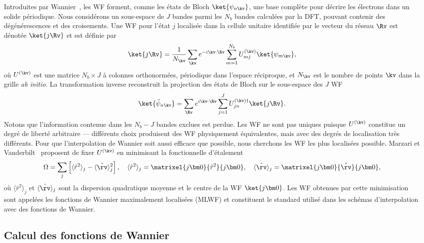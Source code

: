 Introduites par Wannier~\cite{wannierStructureElectronicExcitation1937}, les WF forment, comme les états de Bloch $\ket{\psi_{n\kv}}$, une base
complète pour décrire les électrons dans un solide périodique. Nous considérons
un sous-espace de $J$ bandes parmi les $N_b$ bandes calculées par
la DFT, pouvant contenir des dégénérescences et des croisements.
Une WF pour l'état $j$ localisée dans la cellule unitaire identifiée
par le vecteur du réseau $\Rv$ est dénotée $\ket{j\Rv}$ et est
définie par
\begin{equation}
    \ket{j\Rv} = \frac{1}{N_\kv}\sum_\kv e^{-i\kv\cdot\Rv}
    \sum_{m=1}^{N_b} U_{mj}^{(\kv)}\ket{\psi_{m\kv}},
    \label{eqn:c2_wf_1W}
\end{equation}
où $U^{(\kv)}$ est une matrice $N_b\times J$ à colonnes orthonormées,
périodique dans l'espace réciproque, et $N_\kv$ est le nombre de
points $\kv$ dans la grille \textit{ab initio}. La transformation
inverse reconstruit la projection des états de Bloch sur le
sous-espace des $J$ WF
\begin{equation}
    \ket{\tilde{\psi}_{n\kv}}=\sum_\Rv e^{i\kv\cdot\Rv}
    \sum_{j=1}^{J} U_{jn}^{(\kv)\dag}\ket{j\Rv}.
    \label{eqn:c2_wf_1B}
\end{equation}
Notons que l'information contenue dans les $N_b - J$ bandes exclues est
perdue. Les WF ne sont pas uniques puisque $U^{(\kv)}$ constitue un degré
de liberté arbitraire --- différents choix produisent des WF
physiquement équivalentes, mais avec des degrés de localisation
très différents. Pour que l'interpolation de Wannier soit aussi efficace que possible, nous cherchons les WF les plus localisées possible. Marzari et Vanderbilt~\cite{marzariMaximallyLocalizedGeneralized1997} proposent de fixer $U^{(\kv)}$ en minimisant la fonctionnelle d'étalement
\begin{equation}
    \Omega = \sum_j\left[\langle \hat{r}^2\rangle_j - \langle \hat{\rv} \rangle^2_j\right],\quad  \langle \hat{r}^2\rangle_j = \matrixel{j\bm 0}{\hat{r}^2}{j\bm 0},\quad\langle \hat{\rv} \rangle_j = \matrixel{j\bm 0}{\hat{\rv}}{j\bm 0},\label{eqn:spread}
\end{equation}
où $\langle \hat{r}^2\rangle_j$ et $\langle\hat{\rv}\rangle_j$ sont la dispersion quadratique moyenne et le centre de la WF $\ket{j\bm 0}$. Les WF obtenues par cette minimisation sont appelées les fonctions de Wannier maximalement localisées (MLWF) et constituent le standard utilisé dans les schémas d'interpolation avec des fonctions de Wannier.

\subsection{Calcul des fonctions de Wannier}


